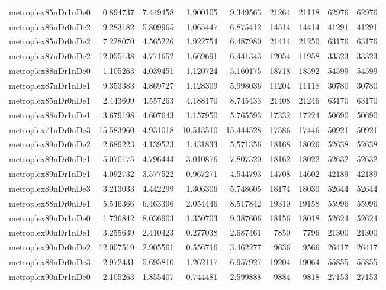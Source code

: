 \begin{longtable}{|l|r|r|r|r|r|r|r|r|}
metroplex85nDr1nDe0 & 0.894737 & 7.449458 & 1.900105 & 9.349563 & 21264 & 21118 & 62976 & 62976 \\
metroplex86nDr0nDe2 & 9.283182 & 5.809965 & 1.065447 & 6.875412 & 14514 & 14414 & 41291 & 41291 \\
metroplex85nDr0nDe2 & 7.228070 & 4.565226 & 1.922754 & 6.487980 & 21414 & 21250 & 63176 & 63176 \\
metroplex87nDr0nDe2 & 12.055138 & 4.771652 & 1.669691 & 6.441343 & 12054 & 11958 & 33323 & 33323 \\
metroplex88nDr1nDe0 & 1.105263 & 4.039451 & 1.120724 & 5.160175 & 18718 & 18592 & 54599 & 54599 \\
metroplex87nDr1nDe1 & 9.353383 & 4.869727 & 1.128309 & 5.998036 & 11204 & 11118 & 30780 & 30780 \\
metroplex85nDr0nDe1 & 2.443609 & 4.557263 & 4.188170 & 8.745433 & 21408 & 21246 & 63170 & 63170 \\
metroplex88nDr1nDe1 & 3.679198 & 4.607643 & 1.157950 & 5.765593 & 17332 & 17224 & 50690 & 50690 \\
metroplex71nDr0nDe3 & 15.583960 & 4.931018 & 10.513510 & 15.444528 & 17586 & 17446 & 50921 & 50921 \\
metroplex89nDr0nDe2 & 2.689223 & 4.139523 & 1.431833 & 5.571356 & 18168 & 18026 & 52638 & 52638 \\
metroplex89nDr0nDe1 & 5.070175 & 4.796444 & 3.010876 & 7.807320 & 18162 & 18022 & 52632 & 52632 \\
metroplex89nDr1nDe1 & 4.092732 & 3.577522 & 0.967271 & 4.544793 & 14708 & 14602 & 42189 & 42189 \\
metroplex89nDr0nDe3 & 3.213033 & 4.442299 & 1.306306 & 5.748605 & 18174 & 18030 & 52644 & 52644 \\
metroplex88nDr0nDe1 & 5.546366 & 6.463396 & 2.054446 & 8.517842 & 19310 & 19158 & 55996 & 55996 \\
metroplex89nDr1nDe0 & 1.736842 & 8.036903 & 1.350703 & 9.387606 & 18156 & 18018 & 52624 & 52624 \\
metroplex90nDr1nDe1 & 3.255639 & 2.410423 & 0.277038 & 2.687461 & 7850 & 7796 & 21300 & 21300 \\
metroplex90nDr0nDe2 & 12.007519 & 2.905561 & 0.556716 & 3.462277 & 9636 & 9566 & 26417 & 26417 \\
metroplex88nDr0nDe3 & 2.972431 & 5.695810 & 1.262117 & 6.957927 & 19204 & 19064 & 55855 & 55855 \\
metroplex90nDr1nDe0 & 2.105263 & 1.855407 & 0.744481 & 2.599888 & 9884 & 9818 & 27153 & 27153 \\

\end{longtable}
